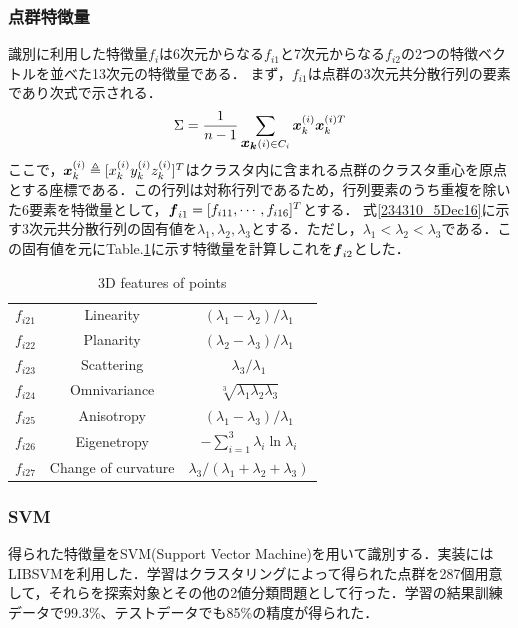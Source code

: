 \documentclass[10pt,a4paper]{jarticle}
\def\vec#1{\mbox{\boldmath$#1$}}
\begin{document}
\subsubsection{点群特徴量}
識別に利用した特徴量$f_{i}$は6次元からなる$f_{i1}$と7次元からなる$f_{i2}$の2つの特徴ベクトルを並べた13次元の特徴量である．
まず，$f_{i1}$は点群の3次元共分散行列の要素であり次式で示される．
\begin{eqnarray}
 \Sigma = \frac{1}{n-1}\sum_{\vec{x_{k}}(i)\in C_{i}}\vec{x}_{k}^{(i)}\vec{x}_{k}^{(i)T}\label{234310_5Dec16}
\end{eqnarray}
ここで，$\vec{x}_{k}^{(i)}\triangleq[x_{k}^{(i)} y_{k}^{(i)} z_{k}^{(i)}]^{T}$はクラスタ内に含まれる点群のクラスタ重心を原点とする座標である．この行列は対称行列であるため，行列要素のうち重複を除いた6要素を特徴量として，$\vec{f}_{i1} = [f_{i11}, \cdots, f_{i16}]^{T}$とする．
式\eqref{234310_5Dec16}に示す3次元共分散行列の固有値を$\lambda_{1}, \lambda_{2}, \lambda_{3}$とする．ただし，$\lambda_{1} < \lambda_{2} < \lambda_{3}$である．この固有値を元にTable.\ref{222525_5Dec16}に示す特徴量を計算しこれを$\vec{f}_{i2}$とした．
\begin{table}
 \centering
 \caption{3D features of points}
 \label{222525_5Dec16}
 \begin{tabular}{|c|c|c|}
  \hline
  $f_{i21}$ & Linearity & $(\lambda_{1}-\lambda_{2})/\lambda_{1}$ \\
  $f_{i22}$ & Planarity & $(\lambda_{2}-\lambda_{3})/\lambda_{1}$ \\
  $f_{i23}$ & Scattering & $\lambda_{3}/\lambda_{1}$ \\
  $f_{i24}$ & Omnivariance & $\sqrt[3]{\lambda_{1}\lambda_{2}\lambda_{3}}$ \\
  $f_{i25}$ & Anisotropy & $(\lambda_{1}-\lambda_{3})/\lambda_{1}$ \\
  $f_{i26}$ & Eigenetropy & $-\sum^{3}_{i=1}\lambda_{i}\ln\lambda_{i}$ \\
  $f_{i27}$ & Change of curvature & $\lambda_{3}/(\lambda_{1}+\lambda_{2}+\lambda_{3})$ \\
  \hline
 \end{tabular}
\end{table}

\subsubsection{SVM}
得られた特徴量をSVM(Support Vector Machine)を用いて識別する．実装にはLIBSVMを利用した．学習はクラスタリングによって得られた点群を287個用意して，それらを探索対象とその他の2値分類問題として行った．学習の結果訓練データで99.3\%、テストデータでも85\%の精度が得られた．
\end{document}
